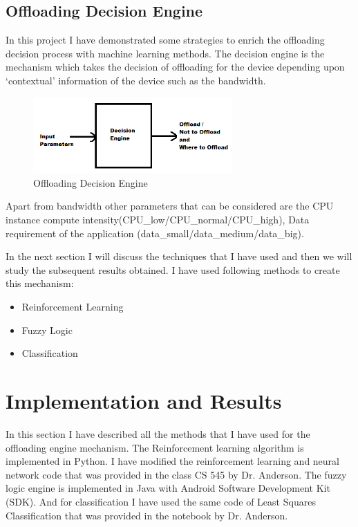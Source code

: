 \documentclass{article}
\begin{document}
\subsection{Offloading Decision Engine}
In this project I have demonstrated some strategies to enrich the offloading decision process with machine learning methods. The decision engine is the mechanism which takes the decision of offloading for the device depending upon `contextual' information of the device such as the bandwidth. \par
\begin{figure}[h]
  \centering
  \includegraphics[width=3in]{offload2.png}
  \caption{Offloading Decision Engine}
  \label{fig:offload2}
\end{figure}
Apart from bandwidth other parameters that can be considered are the CPU instance compute intensity(CPU\_low/CPU\_normal/CPU\_high), Data requirement of the application (data\_small/data\_medium/data\_big). \par
In the next section I will discuss the techniques that I have used and then we will study the subsequent results obtained. I have used following methods to create this mechanism:
\begin{itemize}
\item Reinforcement Learning
\item Fuzzy Logic
\item Classification
\end{itemize}
\section{Implementation and Results}
In this section I have described all the methods that I have used for the offloading engine mechanism. The Reinforcement learning algorithm is implemented in Python. I have modified the reinforcement learning and neural network code that was provided in the class CS 545 by Dr. Anderson. The fuzzy logic engine is implemented in Java with Android Software Development Kit (SDK). And for classification I have used the same code of Least Squares Classification that was provided in the notebook by Dr. Anderson.
\end{document}
